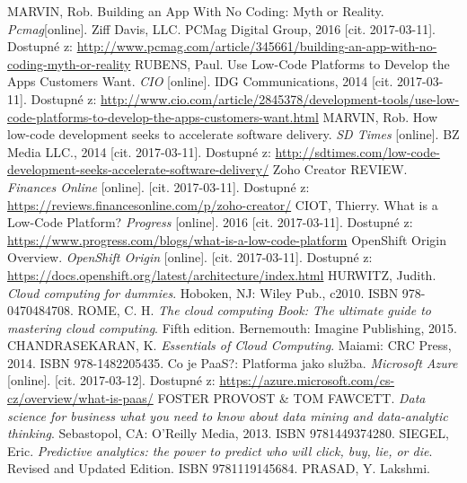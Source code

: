 \begin{thebibliography}{99}

MARVIN, Rob. Building an App With No Coding: Myth or Reality.
\textit{Pcmag}[online].
 Ziff Davis, LLC. PCMag Digital Group, 2016 [cit. 2017-03-11]. Dostupné z: \url{http://www.pcmag.com/article/345661/building-an-app-with-no-coding-myth-or-reality}
RUBENS, Paul. Use Low-Code Platforms to Develop the Apps Customers Want.
\textit{CIO} [online].
IDG Communications, 2014 [cit. 2017-03-11]. Dostupné z: \url{http://www.cio.com/article/2845378/development-tools/use-low-code-platforms-to-develop-the-apps-customers-want.html}
MARVIN, Rob. How low-code development seeks to accelerate software delivery.
\textit{SD Times} [online].
BZ Media LLC., 2014 [cit. 2017-03-11]. Dostupné z: \url{http://sdtimes.com/low-code-development-seeks-accelerate-software-delivery/}
Zoho Creator REVIEW.
\textit{Finances Online} [online].
[cit. 2017-03-11]. Dostupné z: \url{https://reviews.financesonline.com/p/zoho-creator/}
CIOT, Thierry. What is a Low-Code Platform?
\textit{Progress} [online].
2016 [cit. 2017-03-11]. Dostupné z: \url{https://www.progress.com/blogs/what-is-a-low-code-platform}
OpenShift Origin Overview.
\textit{OpenShift Origin} [online].
[cit. 2017-03-11]. Dostupné z: \url{https://docs.openshift.org/latest/architecture/index.html}
HURWITZ, Judith.
\textit{Cloud computing for dummies}.
Hoboken, NJ: Wiley Pub., c2010. ISBN 978-0470484708.
ROME, C. H.
\textit{The cloud computing Book: The ultimate guide to mastering cloud computing}.
Fifth edition. Bernemouth: Imagine Publishing, 2015.
CHANDRASEKARAN, K.
\textit{Essentials of Cloud Computing}.
Maiami: CRC Press, 2014. ISBN 978-1482205435.
Co je PaaS?: Platforma jako služba.
\textit{Microsoft Azure} [online].
[cit. 2017-03-12]. Dostupné z: \url{https://azure.microsoft.com/cs-cz/overview/what-is-paas/}
FOSTER PROVOST \& TOM FAWCETT.
\textit{Data science for business what you need to know about data mining and data-analytic thinking}.
Sebastopol, CA: O'Reilly Media, 2013. ISBN 9781449374280.
SIEGEL, Eric.
\textit{Predictive analytics: the power to predict who will click, buy, lie, or die}.
Revised and Updated Edition. ISBN 9781119145684.
PRASAD, Y. Lakshmi.

\end{thebibliography}
